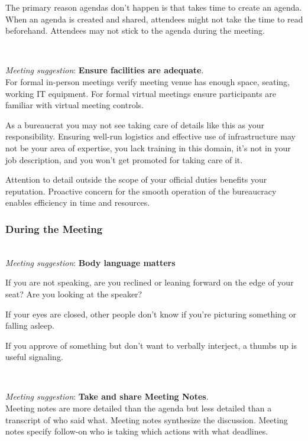 The primary reason agendas don't happen is that takes time to create an agenda. When an agenda is created and shared, attendees might not take the time to read beforehand. Attendees may not stick to the agenda during the meeting.

\ \\
\begin{samepage}
\textit{Meeting suggestion}: \textbf{Ensure facilities are adequate}.\\
For formal in-person meetings verify meeting venue has enough space, seating, working IT equipment. For formal virtual meetings ensure participants are familiar with virtual meeting controls. 
\end{samepage}

As a bureaucrat you may not see taking care of details like this as your responsibility. Ensuring well-run logistics and effective use of infrastructure may not be your area of expertise, you lack training in this domain, it's not in your job description, and you won't get promoted for taking care of it. 

Attention to detail outside the scope of your official duties benefits your reputation. Proactive concern for the smooth operation of the bureaucracy enables efficiency in time and resources.



\subsubsection*{During the Meeting}

\ \\
\textit{Meeting suggestion}: \textbf{Body language matters}

If you are not speaking, are you reclined or leaning forward on the edge of your seat? Are you looking at the speaker?

If your eyes are closed, other people don't know if you're picturing something or falling asleep. 

If you approve of something but don't want to verbally interject, a thumbs up is useful signaling. 

\ \\
\begin{samepage}
\textit{Meeting suggestion}: \textbf{Take and share Meeting Notes}.\\
Meeting notes are more detailed than the agenda but less detailed than a transcript of who said what. Meeting notes synthesize the discussion. Meeting notes specify follow-on who is taking which actions with what deadlines. 
\end{samepage}

